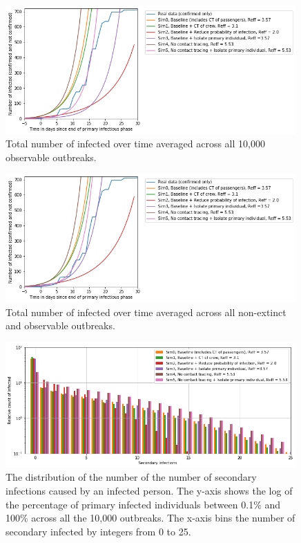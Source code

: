 \documentclass[sr]{drdc-report}
\begin{document}
\begin{figure}
  \includegraphics[width=0.99\textwidth, keepaspectratio=true]{figures/DP_numInf}
  \caption{Total number of infected over time averaged across all 10,000 observable outbreaks.}\label{fig_DP_numInf}
\end{figure}

\begin{figure}
  \includegraphics[width=0.99\textwidth, keepaspectratio=true]{figures/DP_numInfOut}
  \caption{Total number of infected over time averaged across all non-extinct and observable outbreaks.}\label{fig_DP_numInfOut}
\end{figure}

\begin{figure}
  \includegraphics[width=0.99\textwidth, keepaspectratio=true]{figures/DP_distReff}
  \caption{The distribution of the number of the number of secondary infections caused by an infected person. The y-axis shows the log of the percentage of primary infected individuals between 0.1\% and 100\% across all the 10,000 outbreaks. The x-axis bins the number of secondary infected by integers from 0 to 25.}\label{fig_DP_distReff}
\end{figure}
\end{document}

